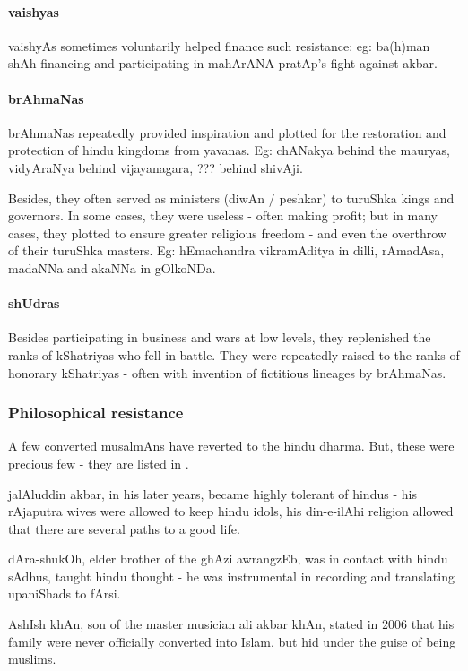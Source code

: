 \documentclass[oneside, article]{memoir}
\begin{document}
\paragraph{vaishyas}
vaishyAs sometimes voluntarily helped finance such resistance: eg: ba(h)man shAh financing and participating in mahArANA pratAp's fight against akbar.

\paragraph{brAhmaNas}
brAhmaNas repeatedly provided inspiration and plotted for the restoration and protection of hindu kingdoms from yavanas. Eg: chANakya behind the mauryas, vidyAraNya behind vijayanagara, ??? behind shivAji.

Besides, they often served as ministers (diwAn / peshkar) to turuShka kings and governors. In some cases, they were useless - often making profit; but in many cases, they plotted to ensure greater religious freedom - and even the overthrow of their turuShka masters. Eg: hEmachandra vikramAditya in dilli, rAmadAsa, madaNNa and akaNNa in gOlkoNDa.

\paragraph{shUdras}
Besides participating in business and wars at low levels, they replenished the ranks of kShatriyas who fell in battle. They were repeatedly raised to the ranks of honorary kShatriyas - often with invention of fictitious lineages by brAhmaNas. 

\subsubsection{Philosophical resistance}
A few converted musalmAns have reverted to the hindu dharma. But, these were precious few - they are listed in .

jalAluddin akbar, in his later years, became highly tolerant of hindus - his rAjaputra wives were allowed to keep hindu idols, his din-e-ilAhi religion allowed that there are several paths to a good life.

dAra-shukOh, elder brother of the ghAzi awrangzEb, was in contact with hindu sAdhus, taught hindu thought - he was instrumental in recording and translating upaniShads to fArsi.

AshIsh khAn, son of the master musician ali akbar khAn, stated in 2006 that his family were never officially converted into Islam, but hid under the guise of being muslims.
\end{document}
